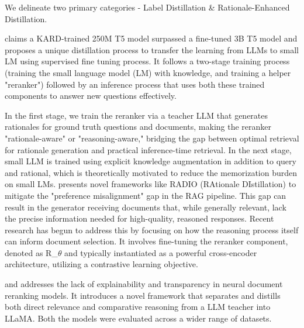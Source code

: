 \documentclass[runningheads]{llncs}
\begin{document}
We delineate two primary categories - Label Distillation \& Rationale-Enhanced Distillation.

\cite{kang2023knowledgeaugmentedreasoningdistillationsmall} claims a KARD-trained 250M T5 model surpassed a fine-tuned 3B T5 model and proposes a unique distillation process to transfer the learning from LLMs to small LM using supervised fine tuning process. It follows a two-stage training process (training the small language model (LM) with knowledge, and training a helper "reranker") followed by an inference process that uses both these trained components to answer new questions effectively.

In the first stage, we train the reranker via a teacher LLM that generates rationales for ground truth questions and documents, making the reranker "rationale-aware" or "reasoning-aware," bridging the gap between optimal retrieval for rationale generation and practical inference-time retrieval. In the next stage, small LLM is trained using explicit knowledge augmentation in addition to query and rational, which is theoretically motivated to reduce the memorization burden on small LMs. \cite{jia2024bridgingrelevancereasoningrationale} presents novel frameworks like RADIO (RAtionale DIstillation) to mitigate the  "preference misalignment" gap in the RAG pipeline. This gap can result in the generator receiving documents that, while generally relevant, lack the precise information needed for high-quality, reasoned responses. Recent research has begun to address this by focusing on how the reasoning process itself can inform document selection. It involves fine-tuning the reranker component, denoted as R\_$\theta$ and typically instantiated as a powerful cross-encoder architecture, utilizing a contrastive learning objective.

\cite{ji2025reasoningrankteachingstudentmodels} and \cite{samarinas2025distillationrefinementreasoningsmall} addresses the lack of explainability and transparency in neural document reranking models. It introduces a novel framework that separates and distills both direct relevance and comparative reasoning from a LLM teacher into LLaMA. Both the models were evaluated across a wider range of datasets.
\end{document}
